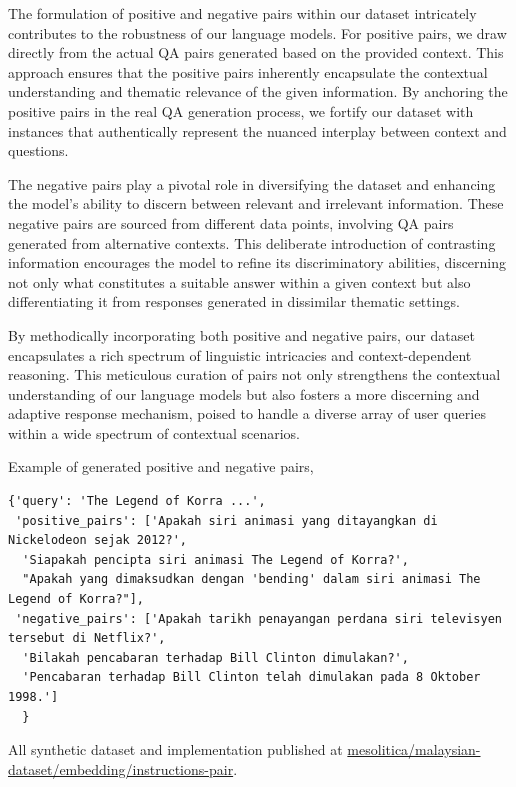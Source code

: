 \documentclass[preprint]{article}
\begin{document}
The formulation of positive and negative pairs within our dataset intricately contributes to the robustness of our language models. For positive pairs, we draw directly from the actual QA pairs generated based on the provided context. This approach ensures that the positive pairs inherently encapsulate the contextual understanding and thematic relevance of the given information. By anchoring the positive pairs in the real QA generation process, we fortify our dataset with instances that authentically represent the nuanced interplay between context and questions.

The negative pairs play a pivotal role in diversifying the dataset and enhancing the model's ability to discern between relevant and irrelevant information. These negative pairs are sourced from different data points, involving QA pairs generated from alternative contexts. This deliberate introduction of contrasting information encourages the model to refine its discriminatory abilities, discerning not only what constitutes a suitable answer within a given context but also differentiating it from responses generated in dissimilar thematic settings.

By methodically incorporating both positive and negative pairs, our dataset encapsulates a rich spectrum of linguistic intricacies and context-dependent reasoning. This meticulous curation of pairs not only strengthens the contextual understanding of our language models but also fosters a more discerning and adaptive response mechanism, poised to handle a diverse array of user queries within a wide spectrum of contextual scenarios.

Example of generated positive and negative pairs,

\begin{lstlisting}[breaklines=true]
  {'query': 'The Legend of Korra ...',
 'positive_pairs': ['Apakah siri animasi yang ditayangkan di Nickelodeon sejak 2012?',
  'Siapakah pencipta siri animasi The Legend of Korra?',
  "Apakah yang dimaksudkan dengan 'bending' dalam siri animasi The Legend of Korra?"],
 'negative_pairs': ['Apakah tarikh penayangan perdana siri televisyen tersebut di Netflix?',
  'Bilakah pencabaran terhadap Bill Clinton dimulakan?',
  'Pencabaran terhadap Bill Clinton telah dimulakan pada 8 Oktober 1998.']
  }
\end{lstlisting}

All synthetic dataset and implementation published at \href{https://github.com/mesolitica/malaysian-dataset/tree/master/embedding/instructions-pair}{mesolitica/malaysian-dataset/embedding/instructions-pair}.
\end{document}
